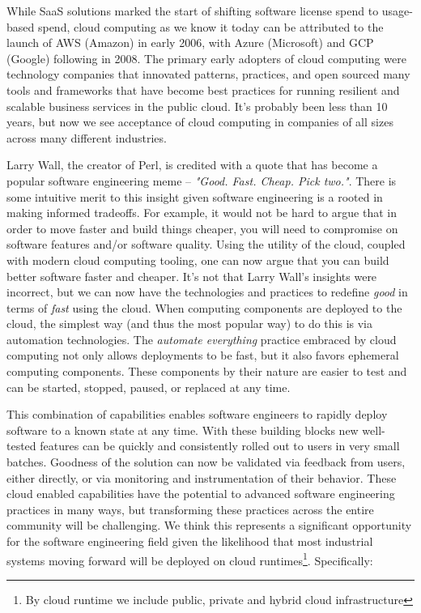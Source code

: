 \documentclass[conference]{IEEEconf}
\begin{document}
While SaaS solutions marked the start of shifting software license spend to usage-based spend, cloud computing as we know it today can be attributed to the launch of AWS (Amazon) \cite{AWSLaunch} in early 2006, with Azure (Microsoft)\cite{AzureLaunch} and GCP (Google)\cite{GCPLaunch} following in 2008. The primary early adopters of cloud computing were technology companies that innovated patterns, practices, and open sourced many tools and frameworks that have become best practices for running resilient and scalable business services in the public cloud.  It's probably been less than 10 years, but now we see acceptance of cloud computing in companies of all sizes across many different industries. 

Larry Wall, the creator of Perl, is credited with a quote that has become a popular software engineering meme -- \textit{"Good. Fast. Cheap. Pick two."}.  There is some intuitive merit to this insight given software engineering is a rooted in making informed tradeoffs.  For example, it would not be hard to argue that in order to move faster and build things cheaper, you will need to compromise on software features and/or software quality. Using the utility of the cloud, coupled with modern cloud computing tooling, one can now argue that you can build better software faster and cheaper.  It's not that Larry Wall's insights were incorrect, but we can now have the technologies and practices to redefine \textit{good} in terms of \textit{fast} using the cloud.  When computing components are deployed to the cloud, the simplest way (and thus the most popular way) to do this is via automation technologies\cite{terraform, AWSCloudFormation, AzureLaunch, Pulumi}.  The \textit{automate everything} practice embraced by cloud computing not only allows deployments to be fast, but it also favors ephemeral computing components. These components by their nature are easier to test\cite{kim2016devops} and can be started, stopped, paused, or replaced at any time. 

This combination of capabilities enables software engineers to rapidly deploy software to a known state at any time. With these building blocks new well-tested features can be quickly and consistently rolled out to users in very small batches.  Goodness of the solution can now be validated via feedback from users, either directly, or via monitoring and instrumentation of their behavior.  These cloud enabled capabilities have the potential to advanced software engineering practices in many ways, but transforming these practices across the entire community will be challenging. We think this represents a significant opportunity for the software engineering field given the likelihood that most industrial systems moving forward will be deployed on cloud runtimes\footnote{By cloud runtime we include public, private and hybrid cloud infrastructure}. Specifically:
\end{document}
